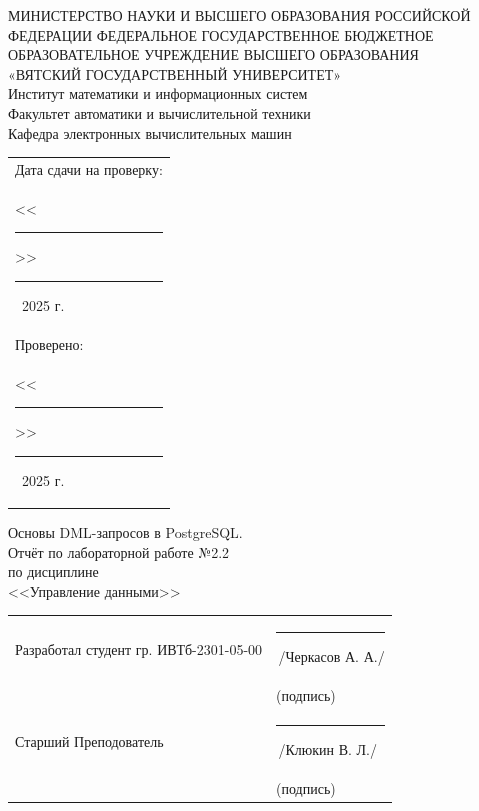 \documentclass[oneside,a4paper,14pt]{extarticle}
\begin{document}
\newpage
\thispagestyle{empty}
\begin{center}
  МИНИСТЕРСТВО НАУКИ И ВЫСШЕГО ОБРАЗОВАНИЯ РОССИЙСКОЙ ФЕДЕРАЦИИ ФЕДЕРАЛЬНОЕ ГОСУДАРСТВЕННОЕ БЮДЖЕТНОЕ ОБРАЗОВАТЕЛЬНОЕ УЧРЕЖДЕНИЕ ВЫСШЕГО ОБРАЗОВАНИЯ\\
  «ВЯТСКИЙ ГОСУДАРСТВЕННЫЙ УНИВЕРСИТЕТ»\\
  Институт математики и информационных систем\\
  Факультет автоматики и вычислительной техники\\
  Кафедра электронных вычислительных машин
\end{center}
\vspace{10mm}

\hfill
\begin{tabular}{l}
  \footnotesize Дата сдачи на проверку:                                          \\
  \footnotesize <<\rule[-1mm]{5mm}{0.10mm}\/>>\rule[-1mm]{20mm}{0.10mm}\ 2025 г. \\
  \footnotesize Проверено:                                                       \\
  \footnotesize <<\rule[-1mm]{5mm}{0.10mm}\/>>\rule[-1mm]{20mm}{0.10mm}\ 2025 г. \\
\end{tabular}
\vfill

\begin{center}
  Основы DML-запросов в PostgreSQL.\\
  Отчёт по лабораторной работе №2.2\\
  по дисциплине\\
  <<Управление данными>>\\
\end{center}
\vspace{25mm}
\noindent
\begin{tabular}{ll}
  Разработал студент гр. ИВТб-2301-05-00 & \hspace{18mm}\rule[-1mm]{30mm}{0.10mm}\,/Черкасов А. А./ \\
                                         & \hspace{25.5mm}\footnotesize(подпись)                    \\
  Старший Преподователь                  & \hspace{18mm}\rule[-1mm]{30mm}{0.10mm}\,/Клюкин В. Л./   \\
                                         & \hspace{25.5mm}\footnotesize(подпись)                    \\
\end{tabular}
\end{document}
